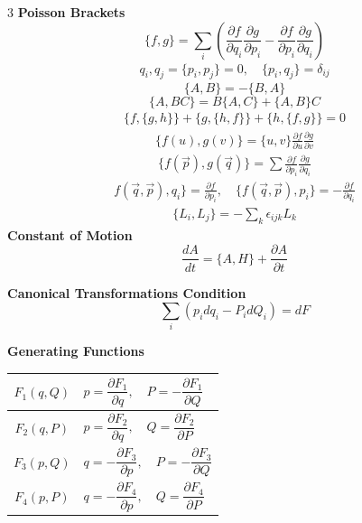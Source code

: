 \documentclass[1pt]{article}
\begin{document}
\begin{multicols}{3}
\textbf{Poisson Brackets}
\begin{equation*}
    \{ f, g \} = \sum_i \left( \frac{\partial f}{\partial q_i} \frac{\partial g}{\partial p_i} - \frac{\partial f}{\partial p_i} \frac{\partial g}{\partial q_i} \right)
\end{equation*}
\begin{align*}
    q_i, q_j = \{p_i, p_j\} = 0, \quad \{p_i, q_j\} = \delta_{ij}
\end{align*}
\begin{equation*}
    \{A, B\} = -\{B, A\}
\end{equation*}
\begin{equation*}
    \{A, BC\} = B\{A, C\} + \{A, B\}C
\end{equation*}
\begin{align*}
    \{{f, \{g,h\}\} + \{g, \{h,f\}\} + \{h, \{f,g\}\} = 0}
\end{align*}
\begin{align*}
   \{f(u), g(v)\} = \{u,v\} \frac{\partial f}{\partial u} \frac{\partial g}{\partial v}
\end{align*}
\begin{align*}
   \{ f(\vec{p}), g(\vec{q})\} = \sum \frac{\partial f}{\partial p_i} \frac{\partial g}{\partial q_i}
\end{align*}
\begin{align*}
    f(\vec{q}, \vec{p}), q_i\} = \frac{\partial f}{\partial p_i}, \quad \{ f(\vec{q}, \vec{p}), p_i\} = -\frac{\partial f}{\partial q_i}
\end{align*}
\begin{align*}
    \{L_i, L_j\} = -\sum_k \epsilon_{ijk} L_k
\end{align*}
\textbf{Constant of Motion}
\begin{equation*}
    \frac{dA}{dt} = \{ A, H \} + \frac{\partial A}{\partial t}
\end{equation*}


\textbf{Canonical Transformations Condition}
\begin{equation*}
    \sum_i (p_i dq_i - P_i dQ_i) = dF
\end{equation*}

\textbf{Generating Functions}
\begin{center}
\begin{tabular}{|c|l|}
\hline
\(F_1(q,Q)\) & \( p=\dfrac{\partial F_1}{\partial q},\quad P=-\dfrac{\partial F_1}{\partial Q}\) \\[4pt] \hline
\(F_2(q,P)\) & \( p=\dfrac{\partial F_2}{\partial q},\quad Q=\dfrac{\partial F_2}{\partial P}\) \\[4pt] \hline
\(F_3(p,Q)\) & \( q=-\dfrac{\partial F_3}{\partial p},\quad P=-\dfrac{\partial F_3}{\partial Q}\) \\[4pt] \hline
\(F_4(p,P)\) & \( q=-\dfrac{\partial F_4}{\partial p},\quad Q=\dfrac{\partial F_4}{\partial P}\) \\[4pt] \hline
\end{tabular}
\end{center}


\end{multicols}
\end{document}

